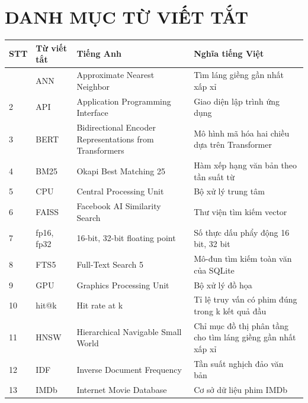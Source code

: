 \documentclass[12pt,a4paper]{article}
\begin{document}
\setcounter{page}{1}

{\setlength{\parskip}{0pt}\tableofcontents}

\clearpage
\section*{DANH MỤC TỪ VIẾT TẮT}

{\def\LTcaptype{}\small
\begin{longtable}[]{@{}P{(\linewidth - 6\tabcolsep) * }P{(\linewidth - 6\tabcolsep) * }P{(\linewidth - 6\tabcolsep) * }P{(\linewidth - 6\tabcolsep) * }@{}}
\toprule
\textbf{STT} & \textbf{Từ viết tắt} & \textbf{Tiếng Anh} & \textbf{Nghĩa tiếng Việt} \\
\midrule
\endhead
\bottomrule
{} & ANN & Approximate Nearest Neighbor & Tìm láng giềng gần nhất xấp xỉ \\
2 & API & Application Programming Interface & Giao diện lập trình ứng dụng \\
3 & BERT & Bidirectional Encoder Representations from Transformers & Mô hình mã hóa hai chiều dựa trên Transformer \\
4 & BM25 & Okapi Best Matching 25 & Hàm xếp hạng văn bản theo tần suất từ \\
5 & CPU & Central Processing Unit & Bộ xử lý trung tâm \\
6 & FAISS & Facebook AI Similarity Search & Thư viện tìm kiếm vector \\
7 & fp16, fp32 & 16-bit, 32-bit floating point & Số thực dấu phẩy động 16 bit, 32 bit \\
8 & FTS5 & Full-Text Search 5 & Mô-đun tìm kiếm toàn văn của SQLite \\
9 & GPU & Graphics Processing Unit & Bộ xử lý đồ họa \\
10 & hit@k & Hit rate at k & Tỉ lệ truy vấn có phim đúng trong k kết quả đầu \\
11 & HNSW & Hierarchical Navigable Small World & Chỉ mục đồ thị phân tầng cho tìm láng giềng gần nhất xấp xỉ \\
12 & IDF & Inverse Document Frequency & Tần suất nghịch đảo văn bản \\
13 & IMDb & Internet Movie Database & Cơ sở dữ liệu phim IMDb \\

\end{longtable}}
\end{document}
